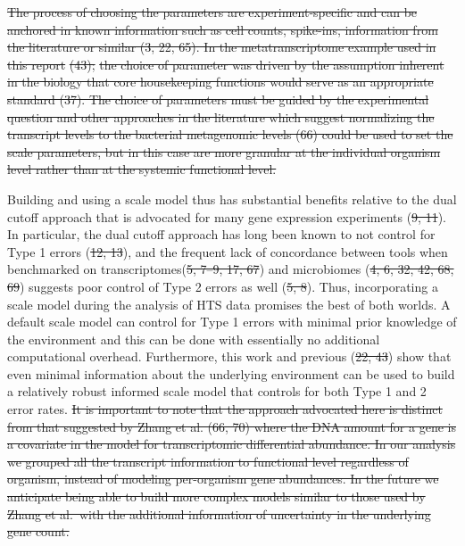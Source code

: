 \documentclass[
]{article}
\providecommand{\DIFadd}[1]{{\protect\color{blue}\uwave{#1}}} %
\providecommand{\DIFdel}[1]{{\protect\color{red}\sout{#1}}}                      %
\providecommand{\DIFaddbegin}{} %
\providecommand{\DIFaddend}{} %
\providecommand{\DIFdelbegin}{} %
\providecommand{\DIFdelend}{} %
\newcommand{\DIFscaledelfig}{0.5}
\newlength{\DIFdelgraphicswidth} %
\newlength{\DIFdelgraphicsheight} %
\newcommand{\DIFaddincludegraphics}[2][]{{\color{blue}\fbox{\DIFOincludegraphics[#1]{#2}}}} %
\newcommand{\DIFdelincludegraphics}[2][]{%
\sbox{\DIFdelgraphicsbox}{\DIFOincludegraphics[#1]{#2}}%
\settoboxwidth{\DIFdelgraphicswidth}{\DIFdelgraphicsbox} %
\settoboxtotalheight{\DIFdelgraphicsheight}{\DIFdelgraphicsbox} %
\scalebox{\DIFscaledelfig}{%
\parbox[b]{\DIFdelgraphicswidth}{\usebox{\DIFdelgraphicsbox}\\[-\baselineskip] \rule{\DIFdelgraphicswidth}{0em}}\llap{\resizebox{\DIFdelgraphicswidth}{\DIFdelgraphicsheight}{%
\setlength{\unitlength}{\DIFdelgraphicswidth}%
\begin{picture}(1,1)%
\thicklines\linethickness{2pt} %
{\color[rgb]{1,0,0}\put(0,0){\framebox(1,1){}}}%
{\color[rgb]{1,0,0}\put(0,0){\line( 1,1){1}}}%
{\color[rgb]{1,0,0}\put(0,1){\line(1,-1){1}}}%
\end{picture}%
}\hspace*{3pt}}} %
} %
\DeclareRobustCommand{\DIFaddbegin}{\DIFOaddbegin \let\includegraphics\DIFaddincludegraphics} %
\DeclareRobustCommand{\DIFaddend}{\DIFOaddend \let\includegraphics\DIFOincludegraphics} %
\DeclareRobustCommand{\DIFdelbegin}{\DIFOdelbegin \let\includegraphics\DIFdelincludegraphics} %
\DeclareRobustCommand{\DIFdelend}{\DIFOaddend \let\includegraphics\DIFOincludegraphics} %
\begin{document}
\DIFdelbegin \DIFdel{The process of choosing the parameters are experiment-specific and can
be anchored in known information such as cell counts, spike-ins,
information from the literature or similar (3, 22, 65). In the
metatranscriptome example used in this report }%
\DIFdel{(43);}%
\DIFdel{the choice of
parameter was driven by the assumption inherent in the biology that core
housekeeping functions would serve as an appropriate standard (37). The
choice of parameters must be guided by the experimental question and
other approaches in the literature which suggest normalizing the
transcript levels to the bacterial metagenomic levels (66) could be used
to set the scale parameters, but in this case are more granular at the
individual organism level rather than at the systemic functional level.
}%

\DIFdelend Building and using a scale model thus has substantial benefits relative
to the dual cutoff approach that is advocated for many gene expression
experiments (\DIFdelbegin \DIFdel{9, 11}\DIFdelend \DIFaddbegin \DIFadd{14, 16}\DIFaddend ). In particular, the dual cutoff approach has long
been known to not control for Type 1 errors (\DIFdelbegin \DIFdel{12, 13}\DIFdelend \DIFaddbegin \DIFadd{17, 18}\DIFaddend ), and the frequent
lack of concordance between tools when benchmarked on transcriptomes(\DIFdelbegin \DIFdel{5,
7--9, 17, 67}\DIFdelend \DIFaddbegin \DIFadd{10,
12--14, 29, 56}\DIFaddend ) and microbiomes (\DIFdelbegin \DIFdel{4, 6, 32, 42, 68, 69}\DIFdelend \DIFaddbegin \DIFadd{9, 11, 31, 40, 57, 58}\DIFaddend ) suggests poor
control of Type 2 errors as well (\DIFdelbegin \DIFdel{5, 8}\DIFdelend \DIFaddbegin \DIFadd{10, 13}\DIFaddend ). Thus, incorporating a scale
model during the analysis of HTS data promises the best of both worlds.
A default scale model can control for Type 1 errors with minimal prior
knowledge of the environment and this can be done with essentially no
additional computational overhead. Furthermore, this work and previous
(\DIFdelbegin \DIFdel{22, 43}\DIFdelend \DIFaddbegin \DIFadd{20}\DIFaddend ) show that even minimal information about the underlying environment
can be used to build a relatively robust informed scale model that
controls for both Type 1 and 2 error rates.
\DIFdelbegin \DIFdel{It is important
to note that the approach advocated here is distinct from that suggested
by Zhang et al. (66, 70) where the DNA amount for a gene is a covariate
in the model for transcriptomic differential abundance. In our analysis
we grouped all the transcript information to functional level regardless
of organism, instead of modeling per-organism gene abundances. In the
future we anticipate being able to build more complex models similar to
those used by Zhang et al.~with the additional information of
uncertainty in the underlying gene count.
}\DIFdelend 
\end{document}
